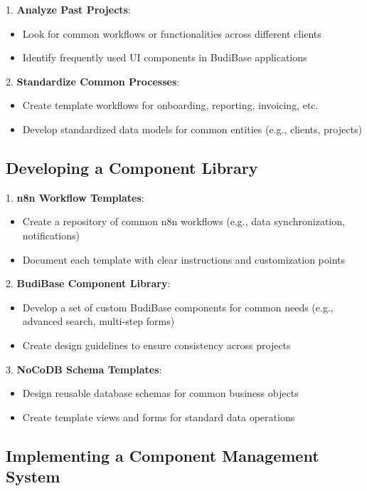 1. \textbf{Analyze Past Projects}:
\begin{itemize}
    \item Look for common workflows or functionalities across different clients
    \item Identify frequently used UI components in BudiBase applications
\end{itemize}

2. \textbf{Standardize Common Processes}:
\begin{itemize}
    \item Create template workflows for onboarding, reporting, invoicing, etc.
    \item Develop standardized data models for common entities (e.g., clients, projects)
\end{itemize}

\subsection{Developing a Component Library}

1. \textbf{n8n Workflow Templates}:
\begin{itemize}
    \item Create a repository of common n8n workflows (e.g., data synchronization, notifications)
    \item Document each template with clear instructions and customization points
\end{itemize}

2. \textbf{BudiBase Component Library}:
\begin{itemize}
    \item Develop a set of custom BudiBase components for common needs (e.g., advanced search, multi-step forms)
    \item Create design guidelines to ensure consistency across projects
\end{itemize}

3. \textbf{NoCoDB Schema Templates}:
\begin{itemize}
    \item Design reusable database schemas for common business objects
    \item Create template views and forms for standard data operations
\end{itemize}

\subsection{Implementing a Component Management System}

